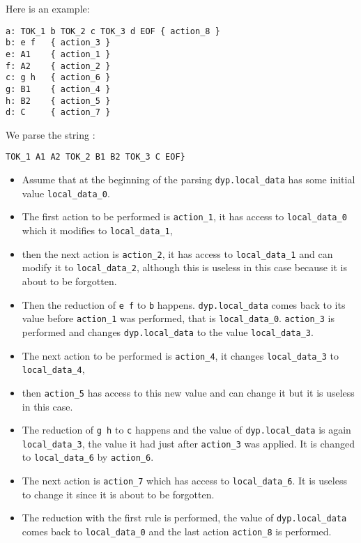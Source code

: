\documentclass[12pt]{article}
\begin{document}
{Here is an example:
\begin{verbatim}
a: TOK_1 b TOK_2 c TOK_3 d EOF { action_8 }
b: e f   { action_3 }
e: A1    { action_1 }
f: A2    { action_2 }
c: g h   { action_6 }
g: B1    { action_4 }
h: B2    { action_5 }
d: C     { action_7 }
\end{verbatim}
We parse the string :
\begin{verbatim}
TOK_1 A1 A2 TOK_2 B1 B2 TOK_3 C EOF}
\end{verbatim}
\begin{itemize}
\item Assume that at the beginning of the parsing 
\texttt{dyp.local\_data} has some initial value \texttt{local\_data\_0}.
\item The first action to be performed is \texttt{action\_1}, it has access to \texttt{local\_data\_0} which it modifies to \texttt{local\_data\_1},
\item then the next action is \texttt{action\_2}, it has access to \texttt{local\_data\_1} and can modify it to \texttt{local\_data\_2}, although this is useless in this case because it is about to be forgotten.
\item Then the reduction of \texttt{e f} to \texttt{b} happens. \texttt{dyp.local\_data} comes back to its value before \texttt{action\_1} was performed, that is \texttt{local\_data\_0}. \texttt{action\_3} is performed and changes \texttt{dyp.local\_data} to the value \texttt{local\_data\_3}.
\item The next action to be performed is \texttt{action\_4}, it changes \texttt{local\_data\_3} to \texttt{local\_data\_4},
\item then \texttt{action\_5} has access to this new value and can change it but it is useless in this case.
\item The reduction of \texttt{g h} to \texttt{c} happens and the value of \texttt{dyp.local\_data} is again \texttt{local\_data\_3}, the value it had just after \texttt{action\_3} was applied. It is changed to \texttt{local\_data\_6} by \texttt{action\_6}.
\item The next action is \texttt{action\_7} which has access to \texttt{local\_data\_6}. It is useless to change it since it is about to be forgotten.
\item The reduction with the first rule is performed, the value of \texttt{dyp.local\_data} comes back to \texttt{local\_data\_0} and the last action \texttt{action\_8} is performed.
\end{itemize}

}
\end{document}
